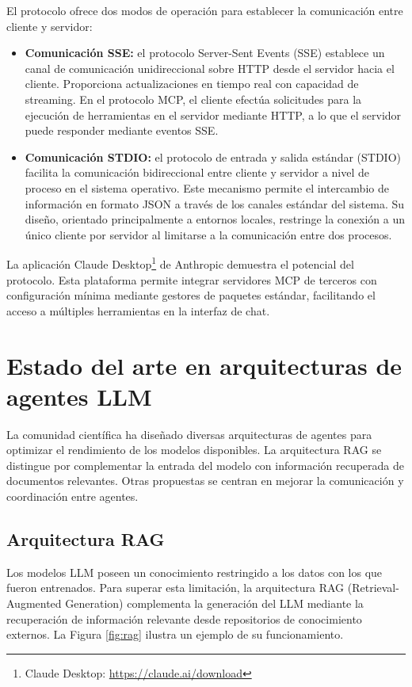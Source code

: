 El protocolo ofrece dos modos de operación para establecer la comunicación entre cliente y servidor:
\begin{itemize}
  \item{\textbf{Comunicación SSE: } el protocolo Server-Sent Events (SSE) establece un canal de comunicación unidireccional sobre HTTP desde el servidor hacia el cliente. Proporciona actualizaciones en tiempo real con capacidad de streaming. En el protocolo MCP, el cliente efectúa solicitudes para la ejecución de herramientas en el servidor mediante HTTP, a lo que el servidor puede responder mediante eventos SSE.}
\item{\textbf{Comunicación STDIO: } el protocolo de entrada y salida estándar (STDIO) facilita la comunicación bidireccional entre cliente y servidor a nivel de proceso en el sistema operativo. Este mecanismo permite el intercambio de información en formato JSON a través de los canales estándar del sistema. Su diseño, orientado principalmente a entornos locales, restringe la conexión a un único cliente por servidor al limitarse a la comunicación entre dos procesos.}
\end{itemize}
La aplicación Claude Desktop\footnote{Claude Desktop: \url{https://claude.ai/download}} de Anthropic demuestra el potencial del protocolo. Esta plataforma permite integrar servidores MCP de terceros con configuración mínima mediante gestores de paquetes estándar, facilitando el acceso a múltiples herramientas en la interfaz de chat.

\section{Estado del arte en arquitecturas de agentes LLM}
\label{sec:estado_arte}

La comunidad científica ha diseñado diversas arquitecturas de agentes para optimizar el rendimiento de los modelos disponibles. La arquitectura RAG se distingue por complementar la entrada del modelo con información recuperada de documentos relevantes. Otras propuestas se centran en mejorar la comunicación y coordinación entre agentes.

\subsection{Arquitectura RAG}

Los modelos LLM poseen un conocimiento restringido a los datos con los que fueron entrenados. Para superar esta limitación, la arquitectura RAG (Retrieval-Augmented Generation) complementa la generación del LLM mediante la recuperación de información relevante desde repositorios de conocimiento externos. La Figura \ref{fig:rag} ilustra un ejemplo de su funcionamiento.    

